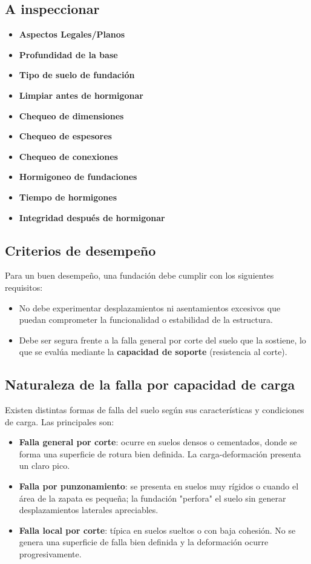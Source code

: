 \documentclass{article} %
\begin{document}
\subsection*{A inspeccionar}
\begin{itemize}
    \item \textbf{Aspectos Legales/Planos}
    \item \textbf{Profundidad de la base}
    \item \textbf{Tipo de suelo de fundación}
    \item \textbf{Limpiar antes de hormigonar}
    \item \textbf{Chequeo de dimensiones}
    \item \textbf{Chequeo de espesores}
    \item \textbf{Chequeo de conexiones}
    \item \textbf{Hormigoneo de fundaciones}
    \item \textbf{Tiempo de hormigones}
    \item \textbf{Integridad después de hormigonar}
\end{itemize}
\subsection*{Criterios de desempeño}

Para un buen desempeño, una fundación debe cumplir con los siguientes requisitos:

\begin{itemize}
    \item No debe experimentar desplazamientos ni asentamientos excesivos que puedan comprometer la funcionalidad o estabilidad de la estructura.
    \item Debe ser segura frente a la falla general por corte del suelo que la sostiene, lo que se evalúa mediante la \textbf{capacidad de soporte} (resistencia al corte).
\end{itemize}

\subsection*{Naturaleza de la falla por capacidad de carga}

Existen distintas formas de falla del suelo según sus características y condiciones de carga. Las principales son:

\begin{itemize}
    \item \textbf{Falla general por corte}: ocurre en suelos densos o cementados, donde se forma una superficie de rotura bien definida. La carga-deformación presenta un claro pico.
    
    \item \textbf{Falla por punzonamiento}: se presenta en suelos muy rígidos o cuando el área de la zapata es pequeña; la fundación "perfora" el suelo sin generar desplazamientos laterales apreciables.

    \item \textbf{Falla local por corte}: típica en suelos sueltos o con baja cohesión. No se genera una superficie de falla bien definida y la deformación ocurre progresivamente.
\end{itemize}
\end{document}
